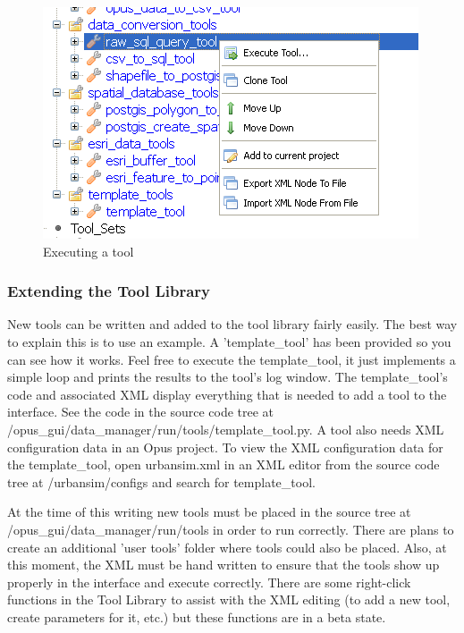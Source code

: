 \begin{figure}[htp]
\begin{center}
\includegraphics[scale=0.8]{part-gui/images/data-manager-opus-tools-tab-execute-tool.png}
\end{center}
\caption{Executing a tool}
\label{execute-tool}
\end{figure}

\subsubsection{Extending the Tool Library}
New tools can be written and added to the tool library fairly easily.  The best way to explain this is to use an example.  A 'template_tool' has been provided so you can see how it works.  Feel free to execute the template_tool, it just implements a simple loop and prints the results to the tool's log window.  The template_tool's code and associated XML display everything that is needed to add a tool to the interface.  See the code in the source code tree at /opus_gui/data_manager/run/tools/template_tool.py.  A tool also needs XML configuration data in an Opus project.  To view the XML configuration data for the template_tool, open urbansim.xml in an XML editor from the source code tree at /urbansim/configs and search for template_tool.

At the time of this writing new tools must be placed in the source tree at /opus_gui/data_manager/run/tools in order to run correctly.  There are plans to create an additional 'user tools' folder where tools could also be placed.  Also, at this moment, the XML must be hand written to ensure that the tools show up properly in the interface and execute correctly.  There are some right-click functions in the Tool Library to assist with the XML editing (to add a new tool, create parameters for it, etc.) but these functions are in a beta state.

